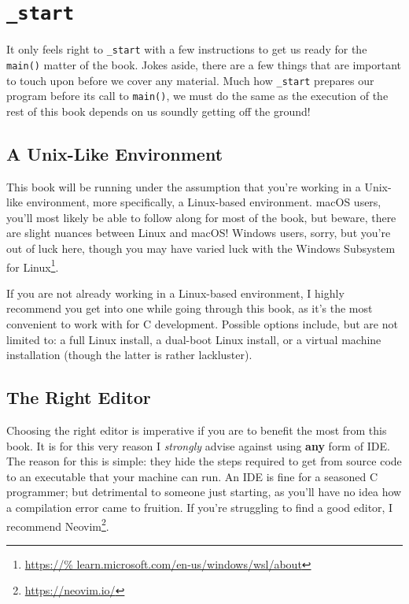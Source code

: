 %

\chapter{\texttt{\_start}}

It only feels right to \texttt{_start} with a few instructions to
get us ready for the \texttt{main()} matter of the book.  Jokes
aside, there are a few things that are important to touch upon before we
cover any material.  Much how \texttt{_start} prepares our
program before its call to \texttt{main()}, we must do the same
as the execution of the rest of this book depends on us soundly getting
off the ground!

\section{A Unix-Like Environment}

This book will be running under the assumption that you're working in a
Unix-like environment, more specifically, a Linux-based environment.
macOS users, you'll most likely be able to follow along for most of the
book, but beware, there are slight nuances between Linux and macOS!
Windows users, sorry, but you're out of luck here, though you may have
varied luck with the Windows Subsystem for Linux\footnote{\url{https://%
learn.microsoft.com/en-us/windows/wsl/about}}.

If you are not already working in a Linux-based environment, I highly
recommend you get into one while going through this book, as it's the
most convenient to work with for C development.  Possible options
include, but are not limited to: a full Linux install, a dual-boot Linux
install, or a virtual machine installation (though the latter is rather
lackluster).

\section{The Right Editor}

Choosing the right editor is imperative if you are to benefit the most
from this book.  It is for this very reason I \emph{strongly} advise
against using \textbf{any} form of IDE.  The reason for this is simple:
they hide the steps required to get from source code to an executable
that your machine can run.  An IDE is fine for a seasoned C programmer;
but detrimental to someone just starting, as you'll have no idea how a
compilation error came to fruition. If you're struggling to find a good
editor, I recommend Neovim\footnote{\url{https://neovim.io/}}.

